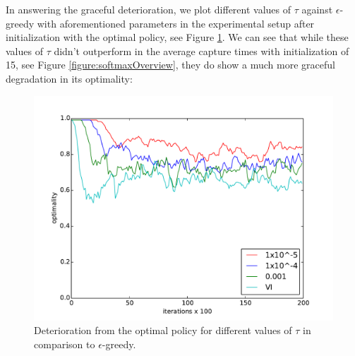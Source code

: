 \documentclass[paper=a4, fontsize=11pt]{scrartcl}
\numberwithin{equation}{section}		%
\numberwithin{figure}{section}			%
\numberwithin{table}{section}				%
\begin{document}
In answering the graceful deterioration, we plot different values of $\tau$ against $\epsilon$-greedy with aforementioned parameters in the experimental setup after initialization with the optimal policy, see Figure \ref{figure:softmxGrace}. We can see that while these values of $\tau$ didn't outperform in the average capture times with initialization of 15, see Figure \ref{figure:softmaxOverview}, they do show a much more graceful degradation in its optimality:
\begin{figure}[H] \centering
\includegraphics[scale=0.6]{softmaxGrace.pdf}
\caption{Deterioration from the optimal policy for different values of $\tau$ in comparison to $\epsilon$-greedy.} 
\label{figure:softmxGrace}
\end{figure}
\end{document}

